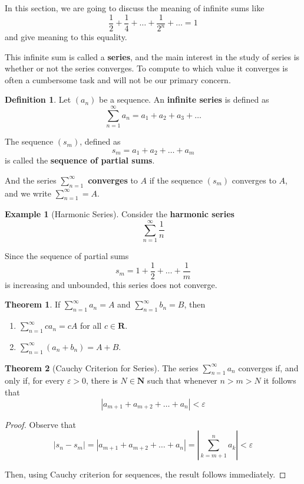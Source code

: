 \documentclass[12pt,a4paper]{article}
\theoremstyle{definition}
\newtheorem{theorem}{Theorem}[section]
\newtheorem{example}{Example}[section]
\newtheorem{definition}{Definition}[section]
\begin{document}
In this section, we are going to discuss the meaning of infinite sums like
\[
	\frac{1}{2} + \frac{1}{4} + \ldots + \frac{1}{2^n} + \ldots = 1
\]
and give meaning to this equality.

This infinite sum is called a \textbf{series}, and the main interest in the study of series is whether or not the series converges. To compute to which value it converges is often a cumbersome task and will not be our primary concern.

\begin{definition}
	Let $(a_n)$ be a sequence. An \textbf{infinite series} is defined as
	\[
		\sum_{n=1}^\infty a_n = a_1 + a_2 + a_3 + \ldots
	\]
	
	The sequence $(s_m)$, defined as
	\[
		s_m = a_1 + a_2 + \ldots + a_m
	\]
	is called the \textbf{sequence of partial sums}.
	
	And the series $\sum_{n=1}^\infty$ \textbf{converges} to $A$ if the sequence $(s_m)$ converges to $A$, and we write $\sum_{n=1}^\infty = A$.
\end{definition}

\begin{example}[Harmonic Series]
	Consider the \textbf{harmonic series}
	\[
		\sum_{n=1}^\infty \frac{1}{n}
	\]
	
	Since the sequence of partial sums
	\[
		s_m = 1 + \frac{1}{2} + \ldots + \frac{1}{m}
	\]
	is increasing and unbounded, this series does not converge. 
\end{example}

\begin{theorem}
	If $\sum_{n=1}^\infty a_n = A$ and $\sum_{n=1}^\infty b_n = B$, then
	\begin{enumerate}
		\item $\sum_{n=1}^\infty c a_n = cA$ for all $c \in \textbf{R}$.
		\item $\sum_{n=1}^\infty (a_n + b_n) = A + B$.
	\end{enumerate}
\end{theorem}

\begin{theorem}[Cauchy Criterion for Series]
	The series $\sum_{n=1}^\infty a_n$ converges if, and only if, for every $\varepsilon > 0$, there is $N \in \textbf{N}$ such that whenever $n > m > N$ it follows that
	\[
		| a_{m+1} + a_{m+2} + \ldots + a_n | < \varepsilon
	\]
\end{theorem}

\begin{proof}
	Observe that
	\[
		| s_n - s_m | = | a_{m+1} + a_{m+2} + \ldots + a_n | = \left| \sum_{k=m+1}^n a_k \right| < \varepsilon
	\]
	
	Then, using Cauchy criterion for sequences, the result follows immediately. 
\end{proof}
\end{document}
